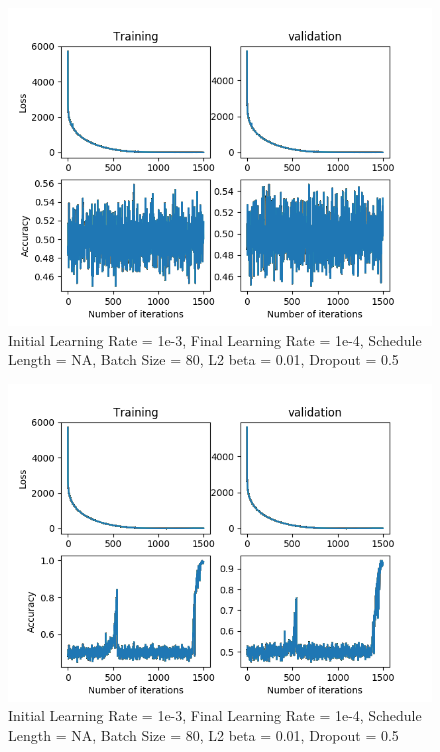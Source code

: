 \documentclass[12pt,reqno]{amsart}
\numberwithin{equation}{section}
\begin{document}
\begin{enumerate}
\begin{figure}[H]
\centering
\includegraphics[scale=0.6]{threshold-test-1e-3-1e-5-1}
\caption{Initial Learning Rate = 1e-3, Final Learning Rate = 1e-4, Schedule Length = NA, Batch Size = 80, L2 beta = 0.01, Dropout = 0.5}
\end{figure}

\begin{figure}[H]
\centering
\includegraphics[scale=0.6]{threshold-test-1e-3-1e-5-2}
\caption{Initial Learning Rate = 1e-3, Final Learning Rate = 1e-4, Schedule Length = NA, Batch Size = 80, L2 beta = 0.01, Dropout = 0.5}
\end{figure}


\end{enumerate}
\end{document}

